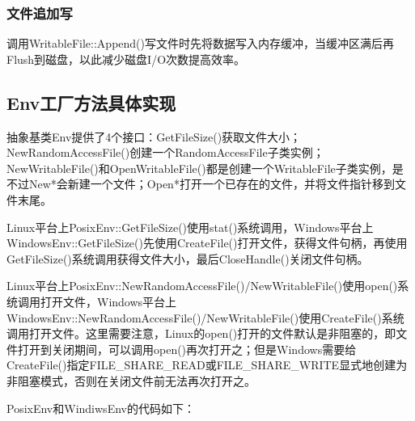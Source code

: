 \documentclass[bachelor]{thesis-uestc}
\begin{document}
\subsubsection{文件追加写}
调用WritableFile::Append()写文件时先将数据写入内存缓冲，当缓冲区满后再Flush到磁盘，以此减少磁盘I/O次数提高效率。

\subsection{Env工厂方法具体实现}
抽象基类Env提供了4个接口：GetFileSize()获取文件大小；NewRandomAccessFile()创建一个RandomAccessFile子类实例；NewWritableFile()和OpenWritableFile()都是创建一个WritableFile子类实例，是不过New*会新建一个文件；Open*打开一个已存在的文件，并将文件指针移到文件末尾。\par
Linux平台上PosixEnv::GetFileSize()使用stat()系统调用，Windows平台上WindowsEnv::GetFileSize()先使用CreateFile()打开文件，获得文件句柄，再使用GetFileSize()系统调用获得文件大小，最后CloseHandle()关闭文件句柄。\par
Linux平台上PosixEnv::NewRandomAccessFile()/NewWritableFile()使用open()系统调用打开文件，Windows平台上WindowsEnv::NewRandomAccessFile()/NewWritableFile()使用CreateFile()系统调用打开文件。这里需要注意，Linux的open()打开的文件默认是非阻塞的，即文件打开到关闭期间，可以调用open()再次打开之；但是Windows需要给CreateFile()指定FILE\_SHARE\_READ或FILE\_SHARE\_WRITE显式地创建为非阻塞模式，否则在关闭文件前无法再次打开之。\par
PosixEnv和WindiwsEnv的代码如下：
\end{document}
